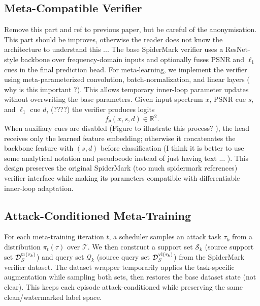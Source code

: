 \subsection{Meta-Compatible Verifier}
{\color{red}
    Remove this part and ref to previous paper, but be careful of the anonymisation.
}
{\color{blue} This part should be improves, otherwise the reader does not know the architecture to understand this ...}
The base SpiderMark verifier uses a ResNet-style backbone over frequency-domain inputs and optionally fuses PSNR and $\ell_1$ cues in the final prediction head.
For meta-learning, we implement the verifier using meta-parameterized convolution, batch-normalization, and linear layers ({\color{blue} why is this important ?)}.
This allows temporary inner-loop parameter updates without overwriting the base parameters.
Given input spectrum $x$, PSNR cue $s$, and $\ell_1$ cue $d$, {\color{blue}(????)} the verifier produces logits
\begin{equation}
    f_{\theta}(x, s, d) \in \mathbb{R}^2.
\end{equation}
When auxiliary cues are disabled {\color{blue}(Figure to illustrate this process? )}, the head receives only the learned feature embedding; otherwise it concatenates the backbone feature with $(s,d)$ before classification {\color{blue}(I think it is better to use some analytical notation and pseudocode  instead of just having text ... )}.
This design preserves the original SpiderMark  {\color{blue} (too much spidermark references)} verifier interface while making its parameters compatible with differentiable inner-loop adaptation.

\subsection{Attack-Conditioned Meta-Training}

For each meta-training iteration $t$, a scheduler samples an attack task $\tau_k$ from a distribution $\pi_t(\tau)$ over $\mathcal{T}$.
We then construct a support set $\mathcal{S}_k$ {\color{blue} (source support set ${\cal D}_{S}^{{\rm tr}(\tau_k)}$)} and query set $\mathcal{Q}_k$ {\color{blue} (source query set ${\cal D}_{S}^{{\rm vl}(\tau_k)}$)} from the SpiderMark verifier dataset.
The dataset wrapper temporarily applies the task-specific augmentation while sampling both sets, then restores the base dataset state {\color{blue} (not clear)}.
This keeps each episode attack-conditioned while preserving the same clean/watermarked label space.

